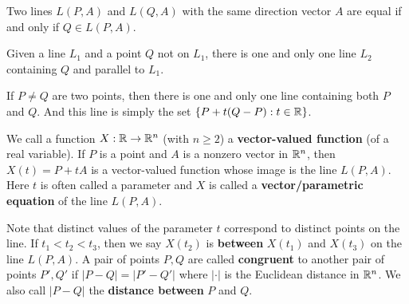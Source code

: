 \documentclass[a4paper]{ctexart}
\begin{document}
    \begin{mythm}
        Two lines $L(P,A)$ and $L(Q,A)$ with the same direction vector $A$ are equal if and only if $Q\in L(P,A)$.
    \end{mythm}
    \begin{mythm}
        Given a line $L_1$ and a point $Q$ not on $L_1$, there is one and only one line $L_2$ containing $Q$ and parallel to $L_1$.
    \end{mythm}
    \begin{mythm}
        If $P\neq Q$ are two points, then there is one and only one line containing both $P$ and $Q$. And this line is simply the set $\{ P+t(Q-P) : t\in \mathbb{R}\}$.
    \end{mythm}
    \begin{mythm}
        We call a function $X: \mathbb{R} \to \mathbb{R}^n$ (with $n\ge 2$) a \textbf{vector-valued function} (of a real variable). If $P$ is a point and $A$ is a nonzero vector in $\mathbb{R}^n$, then $X(t) = P+tA$ is a vector-valued function whose image is the line $L(P,A)$. Here $t$ is often called a parameter and $X$ is called a \textbf{vector/parametric equation} of the line $L(P,A)$.
    \end{mythm}
    \begin{mydef}
        Note that distinct values of the parameter $t$ correspond to distinct points on the line. If $t_1<t_2<t_3$, then we say $X(t_2)$ is \textbf{between} $X(t_1)$ and $X(t_3)$ on the line $L(P,A)$. A pair of points $P,Q$ are called \textbf{congruent} to another pair of points $P',Q'$ if $|P-Q| = |P'-Q'|$ where $|\cdot|$ is the Euclidean distance in $\mathbb{R}^n$. We also call $|P-Q|$ the \textbf{distance between} $P$ and $Q$.
    \end{mydef}
\end{document}
